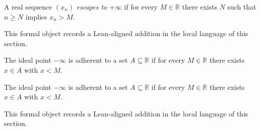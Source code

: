 \begin{remark*}
A real sequence $(x_n)$ \emph{escapes to $+\infty$} if for every $M\in\mathbb R$ there exists $N$ such that $n\ge N$ implies $x_n>M$.
\end{remark*}

\begin{remark*}[Interpretation]
This formal object records a Lean-aligned addition in the local language of this section.
\end{remark*}

\begin{dependencies}
\NoLocalDependencies
\end{dependencies}
\begin{definition}
\label{def:minus-infty-adherent}
The ideal point $-\infty$ is adherent to a set $A\subseteq\mathbb R$ if for every $M\in\mathbb R$ there exists $x\in A$ with $x<M$.
\end{definition}

\begin{remark*}
The ideal point $-\infty$ is adherent to a set $A\subseteq\mathbb R$ if for every $M\in\mathbb R$ there exists $x\in A$ with $x<M$.
\end{remark*}

\begin{remark*}[Interpretation]
This formal object records a Lean-aligned addition in the local language of this section.
\end{remark*}

\begin{dependencies}
\NoLocalDependencies
\end{dependencies}
